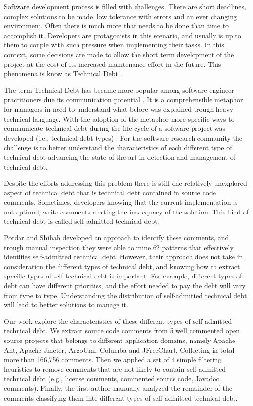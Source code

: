Software development process is filled with challenges. There are short deadlines, complex solutions to be made, low tolerance with errors and an ever changing environment. Often there is much more that needs to be done than time to accomplish it. Developers are protagonists in this scenario, and usually is up to them to couple with such pressure when implementing their tasks. In this context, some decisions are made to allow the short term development of the project at the cost of its increased maintenance effort in the future. This phenomena is know as Technical Debt \cite{Cunningham1992}. 

The term Technical Debt has became more popular among software engineer practitioners due its communication potential \cite{Spinola2013MTD}. It is a comprehensible metaphor for managers in need to understand what before was explained trough heavy technical language. With the adoption of the metaphor more specific ways to communicate technical debt during the life cycle of a software project was developed (i.e., technical debt types) \cite{Alves2014MTD}\cite{Kruchten2012}. For the software research community the challenge is to better understand the characteristics of each different type of technical debt advancing the state of the art in detection and management of technical debt.

Despite the efforts addressing this problem there is still one relatively unexplored aspect of technical debt that is technical debt contained in source code comments. Sometimes, developers knowing that the current implementation is not optimal, write comments alerting the inadequacy of the solution. This kind of technical debt is called self-admitted technical debt. 

Potdar and Shihab \cite{Potdar2014ICSME} developed an approach to identify these comments, and trough manual inspection they were able to mine 62 patterns that effectively identifies self-admitted technical debt. However, their approach does not take in consideration the different types of technical debt, and knowing how to extract specific types of self-technical debt is important. For example, different types of debt can have different priorities, and the effort needed to pay the debt will vary from type to type. Understanding the distribution of self-admitted technical debt will lead to better solutions to manage it.

Our work explore the characteristics of these different types of self-admitted technical debt. We extract source code comments from 5 well commented open source projects that belongs to different application domains, namely Apache Ant, Apache Jmeter, ArgoUml, Columba and JFreeChart. Collecting in total more than 166,756 comments. Then we applied a set of 4 simple filtering heuristics to remove comments that are not likely to contain self-admitted technical debt (e.g., license comments, commented source code, Javadoc comments). Finally, the first author manually analyzed the remainder of the comments classifying them into different types of self-admitted technical debt. 

